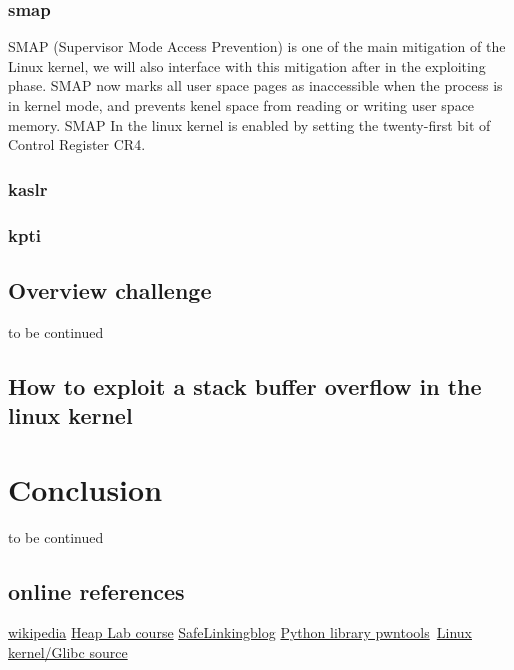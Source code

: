 \documentclass{report}
\begin{document}
    \subsection{smap}
    SMAP (Supervisor Mode Access Prevention) is one of the main mitigation of the Linux kernel, we will also interface with this mitigation after in the exploiting phase.\newline
    SMAP now marks all user space pages as inaccessible when the process is in kernel mode, and prevents kenel space from reading or writing user space memory.\newline
    SMAP In the linux kernel is enabled by setting the twenty-first bit of Control Register CR4.\newline
    

    

    \subsection{kaslr}
    \subsection{kpti}
    
    \section{Overview challenge}
    to be continued
    \clearpage
    \section{How to exploit a stack buffer overflow in the linux kernel }
    \chapter{Conclusion}
    to be continued
    \section{online references}
    \href{https://it.wikipedia.org/wiki/Home_page}{wikipedia}\newline
    \href{https://it.wikipedia.org/wiki/Home_page}{Heap Lab course}\newline
    \href{https://www.researchinnovations.com/post/bypassing-the-upcoming-safe-linking-mitigation}{SafeLinkingblog}\newline 
    \href{https://docs.pwntools.com/en/stable/}{Python library pwntools}\newline\
    \href{https://elixir.bootlin.com/}{Linux kernel/Glibc source}\newline
    \clearpage
\end{document}
